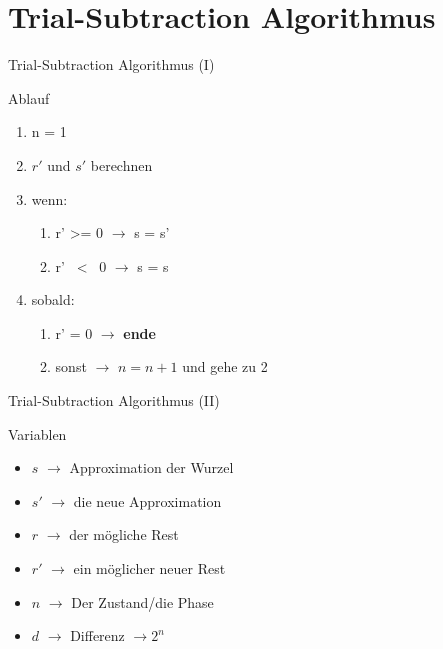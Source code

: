 
  \section{Trial-Subtraction Algorithmus}
  \begin{frame} {Trial-Subtraction Algorithmus (I)}
    \begin{block} {Ablauf}
      \begin{enumerate}
        \item n = 1
        \item $r'$ und $s'$ berechnen
        \item wenn:
        \begin{enumerate}
          \item r' >= 0 $\rightarrow$ s = s'
          \item r' ~< ~0 $\rightarrow$ s = s
        \end{enumerate}
        \item sobald:
        \begin{enumerate}
          \item r' = 0 $\rightarrow$ \textbf{ende}
          \item sonst $\rightarrow$ $n = n + 1$ und gehe zu 2
        \end{enumerate} 
      \end{enumerate}
    \end{block}
  \end{frame}

  \begin{frame} {Trial-Subtraction Algorithmus (II)}
    \begin{block} {Variablen}
      \begin{itemize}
        \item $s$ $\rightarrow$ Approximation der Wurzel
        \item $s'$ $\rightarrow$ die neue Approximation
        \item $r$ $\rightarrow$ der mögliche Rest
        \item $r'$ $\rightarrow$ ein möglicher neuer Rest
        \item $n$ $\rightarrow$ Der Zustand/die Phase
        \item $d$ $\rightarrow$ Differenz $\rightarrow 2^n$
      \end{itemize}
    \end{block}
  \end{frame}

